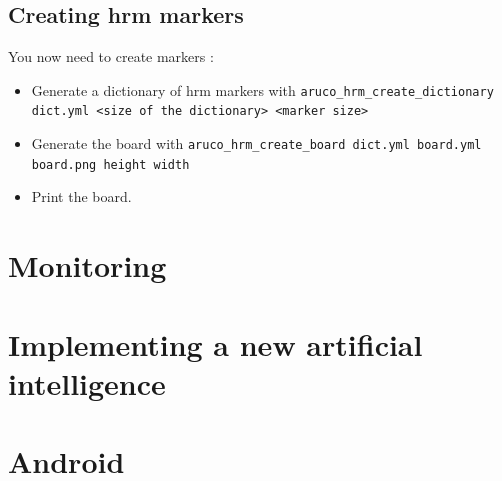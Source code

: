 \documentclass[a4paper,11pt]{report}
\begin{document}
\subsection{Creating hrm markers}
\label{subsec:dic}

You now need to create markers : \begin{itemize}

    \item Generate a dictionary of hrm markers with
        \texttt{aruco\_hrm\_create\_dictionary dict.yml <size of the
        dictionary> <marker size>}

    \item Generate the board with \texttt{aruco\_hrm\_create\_board dict.yml
        board.yml board.png height width}

    \item Print the board.

\end{itemize}

\section{Monitoring}

\section{Implementing a new artificial intelligence}

\section{Android}
\end{document}
